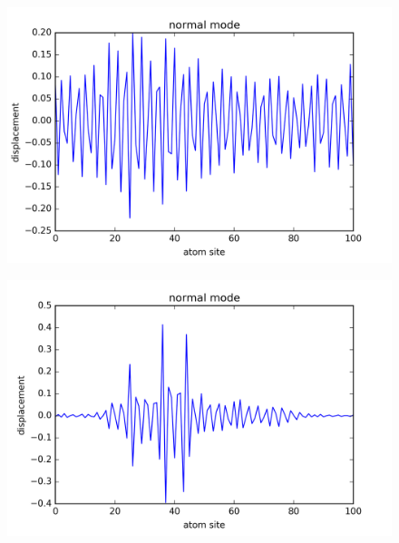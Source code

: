 \begin{figure}[!htbh]
\centering
\begin{minipage}{.45\textwidth}
  \centering
  \includegraphics[width=1.1\linewidth]{Harmonic_spring_ratio/spr_N_103sp_1_1p_0_576th.png}
  \label{fig:spring_N_103m_1.1_p_0_5_76th}
\end{minipage}\qquad
\begin{minipage}{.45\textwidth}
  \centering
  \includegraphics[width=1.1\linewidth]{Harmonic_spring_ratio/spr_N_103sp_1_5p_0_576th.png}
  \label{fig:spring_N_103m_1.5_p_0_5_51st}
\end{minipage}
\end{figure}
